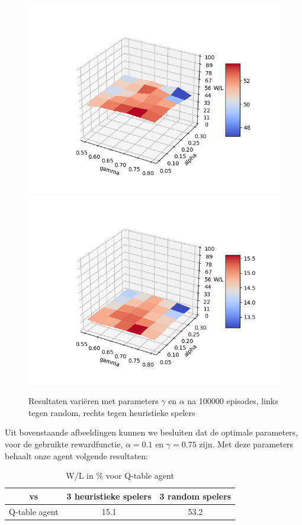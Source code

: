 \documentclass[11pt]{article}
\begin{document}
\newpage
\begin{figure}[h]
\centering
\includegraphics[scale=0.50]{images/qtable_parameter_random_zoomed.png}
\includegraphics[scale=0.50]{images/qtable_parameter_heuristic_zoomed.png}
\caption{Resultaten variëren met parameters $\gamma$ en $\alpha$ na 100000 episodes, links tegen random, rechts tegen heuristieke spelers}
\end{figure}
Uit bovenstaande afbeeldingen kunnen we besluiten dat de optimale parameters, voor de gebruikte rewardfunctie, $\alpha = 0.1$ en $\gamma = 0.75$ zijn. Met deze parameters behaalt onze agent volgende resultaten:
\begin{table}[H]
        \centering
        \begin{tabular}{|c|c|c|}
                \hline
                  vs           & 3 heuristieke spelers & 3 random spelers \\
                \hline
                 Q-table agent & 15.1                    & 53.2\\
                \hline
        \end{tabular}
        \caption{W/L in \% voor Q-table agent}
\end{table}
\end{document}
